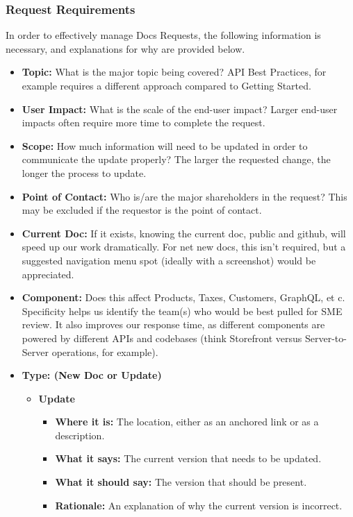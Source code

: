 \documentclass[a4paper]{article}
\begin{document}
\subsubsection*{Request Requirements}
In order to effectively manage Docs Requests, the following information is necessary, and explanations for why are provided below.
\begin{itemize}
	\item \textbf{Topic:} What is the major topic being covered? API Best Practices, for example requires a different approach compared to Getting Started.
	\item \textbf{User Impact:} What is the scale of the end-user impact? Larger end-user impacts often require more time to complete the request.
	\item \textbf{Scope:} How much information will need to be updated in order to communicate the update properly? The larger the requested change, the longer the process to update.
	\item \textbf{Point of Contact:} Who is/are the major shareholders in the request? This may be excluded if the requestor is the point of contact.
	\item \textbf{Current Doc:} If it exists, knowing the current doc, public and github, will speed up our work dramatically. For net new docs, this isn't required, but a suggested navigation menu spot (ideally with a screenshot) would be appreciated.
	\item \textbf{Component:} Does this affect Products, Taxes, Customers, GraphQL, et c. Specificity helps us identify the team(s) who would be best pulled for SME review. It also improves our response time, as different components are powered by different APIs and codebases (think Storefront versus Server-to-Server operations, for example).
	\item \textbf{Type: (New Doc or Update)}
	\begin{itemize}
		\item \textbf{Update}
		\begin{itemize}
			\item \textbf{Where it is:} The location, either as an anchored link or as a description.
			\item \textbf{What it says:} The current version that needs to be updated.
			\item \textbf{What it should say:} The version that should be present.
			\item \textbf{Rationale:} An explanation of why the current version is incorrect.
		\end{itemize}

\end{itemize}
\end{itemize}
\end{document}
